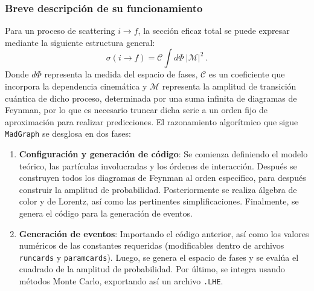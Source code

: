 \documentclass[12pt, a4paper]{article}
\begin{document}
\subsubsection{Breve descripción de su funcionamiento}
Para un proceso de scattering $i\to f$, la sección eficaz total se puede expresar mediante la siguiente estructura general:
\begin{equation}
    \sigma(i\to f)=\mathcal C\int d\Phi\ |\mathcal M|^2\ .
\end{equation}
Donde $d\Phi$ representa la medida del espacio de fases, $\mathcal{C}$ es un coeficiente que incorpora la dependencia cinemática y $\mathcal{M}$ representa la amplitud de transición cuántica de dicho proceso, determinada por una suma infinita de diagramas de Feynman, por lo que es necesario truncar dicha serie a un orden fijo de aproximación para realizar predicciones.
El razonamiento algorítmico que sigue \texttt{MadGraph} se desglosa en dos fases:
\begin{enumerate}
    \item \textbf{Configuración y generación de código}: Se comienza definiendo el modelo teórico, las partículas involucradas y los órdenes de interacción. Después se construyen todos los diagramas de Feynman al orden especifico, para después construir la amplitud de probabilidad. Posteriormente se realiza álgebra de color y de Lorentz, así como las pertinentes simplificaciones. Finalmente, se genera el código para la generación de eventos.
    \item \textbf{Generación de eventos}: Importando el código anterior, así como los valores numéricos de las constantes requeridas (modificables dentro de archivos \texttt{run\textunderscore cards} y \texttt{param\textunderscore cards}). Luego, se genera el espacio de fases y se evalúa el cuadrado de la amplitud de probabilidad. Por último, se integra usando métodos Monte Carlo, exportando así un archivo \texttt{.LHE}.
\end{enumerate}
\end{document}
